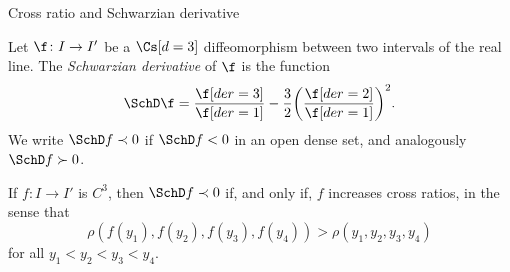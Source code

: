 \documentclass[shortlabels, 9pt, aspectratio=2013]{beamer}
\begin{document}
\begin{frame}{Cross ratio and Schwarzian derivative}
  \begin{definition}
    Let \(\f \colon I \to I'\) be a \(\Cs[d = 3]\) diffeomorphism between two intervals of the real line.
    The \emph{Schwarzian derivative} of \(\f\) is the function
    \begin{equation*}
      \SchD\f = \frac{\f[der = 3]}{\f[der = 1]} - \frac{3}{2}\rpar*{\frac{\f[der = 2]}{\f[der = 1]}}^2.
    \end{equation*}
    We write \(\SchD f \prec 0\) if \(\SchD f < 0\) in an open dense set, and analogously \(\SchD f \succ 0\).
  \end{definition}
  \begin{lemma}\label{lem:sch-cross-increase}
    If \(f \colon I \to I'\) is \(C^3\), then \(\SchD f \prec 0\) if, and only if, \(f\) increases cross ratios, in the sense that \[\rho(f(y_{1}),f(y_2),f(y_3),f(y_4)) > \rho(y_{1},y_2,y_3,y_4)\] for all \(y_1 < y_2 < y_3 < y_{4}\).
  \end{lemma}
\end{frame}
\end{document}
